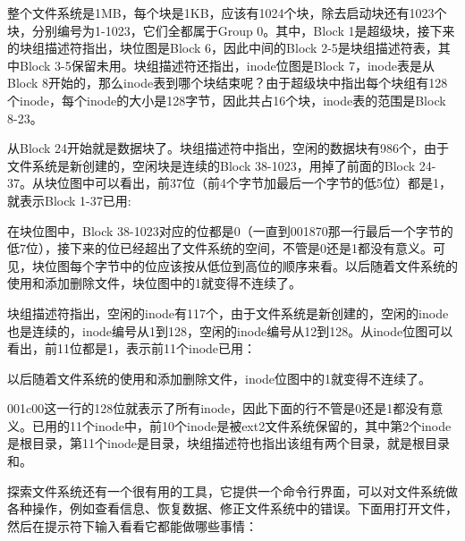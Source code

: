 


整个文件系统是1MB，每个块是1KB，应该有1024个块，除去启动块还有1023个块，分别编号为1-1023，它们全都属于Group 0。其中，Block 1是超级块，接下来的块组描述符指出，块位图是Block 6，因此中间的Block 2-5是块组描述符表，其中Block 3-5保留未用。块组描述符还指出，inode位图是Block 7，inode表是从Block 8开始的，那么inode表到哪个块结束呢？由于超级块中指出每个块组有128个inode，每个inode的大小是128字节，因此共占16个块，inode表的范围是Block 8-23。



从Block 24开始就是数据块了。块组描述符中指出，空闲的数据块有986个，由于文件系统是新创建的，空闲块是连续的Block 38-1023，用掉了前面的Block 24-37。从块位图中可以看出，前37位（前4个字节加最后一个字节的低5位）都是1，就表示Block 1-37已用:




在块位图中，Block 38-1023对应的位都是0（一直到001870那一行最后一个字节的低7位），接下来的位已经超出了文件系统的空间，不管是0还是1都没有意义。可见，块位图每个字节中的位应该按从低位到高位的顺序来看。以后随着文件系统的使用和添加删除文件，块位图中的1就变得不连续了。



块组描述符指出，空闲的inode有117个，由于文件系统是新创建的，空闲的inode也是连续的，inode编号从1到128，空闲的inode编号从12到128。从inode位图可以看出，前11位都是1，表示前11个inode已用：




以后随着文件系统的使用和添加删除文件，inode位图中的1就变得不连续了。



001c00这一行的128位就表示了所有inode，因此下面的行不管是0还是1都没有意义。已用的11个inode中，前10个inode是被ext2文件系统保留的，其中第2个inode是根目录，第11个inode是目录，块组描述符也指出该组有两个目录，就是根目录和。



探索文件系统还有一个很有用的工具，它提供一个命令行界面，可以对文件系统做各种操作，例如查看信息、恢复数据、修正文件系统中的错误。下面用打开文件，然后在提示符下输入看看它都能做哪些事情：




